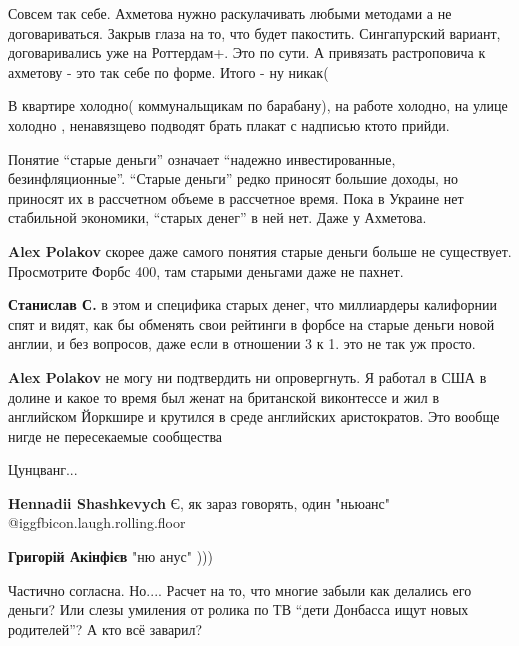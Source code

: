 \begin{itemize}
Совсем так себе.
Ахметова нужно раскулачивать любыми методами а не договариваться. Закрыв глаза на то, что будет пакостить.
Сингапурский вариант, договаривались уже на Роттердам+.
Это по сути.
А привязать растроповича к ахметову - это так себе по форме.
Итого - ну никак(


В квартире холодно( коммунальщикам по барабану), на работе холодно, на улице
холодно , ненавязщево подводят брать плакат с надписью ктото прийди.



Понятие \enquote{старые деньги} означает \enquote{надежно инвестированные, безинфляционные}.
\enquote{Старые деньги} редко приносят большие доходы, но приносят их в рассчетном
объеме в рассчетное время. Пока в Украине нет стабильной экономики, \enquote{старых
денег} в ней нет. Даже у Ахметова.

\begin{itemize} %
\textbf{Alex Polakov} скорее даже самого понятия старые деньги больше не существует. Просмотрите Форбс 400, там старыми деньгами даже не пахнет.

\textbf{Станислав С.} в этом и специфика старых денег, что миллиардеры калифорнии спят и видят, как бы обменять свои рейтинги в форбсе на старые деньги новой англии, и без вопросов, даже если в отношении 3 к 1. это не так уж просто.

\textbf{Alex Polakov} не могу ни подтвердить ни опровергнуть. Я работал в США в долине и какое то время был женат на британской виконтессе и жил в английском Йоркшире и крутился в среде английских аристократов. Это вообще нигде не пересекаемые сообщества
\end{itemize} %

Цунцванг...

\textbf{Hennadii Shashkevych} Є, як зараз говорять, один "ньюанс"  @igg{fbicon.laugh.rolling.floor} 

\textbf{Григорій Акінфієв} "ню анус" )))


Частично согласна. Но.... Расчет на то, что многие забыли как делались его
деньги? Или слезы умиления от ролика по ТВ \enquote{дети Донбасса ищут новых
родителей}? А кто всё заварил?



\end{itemize}
